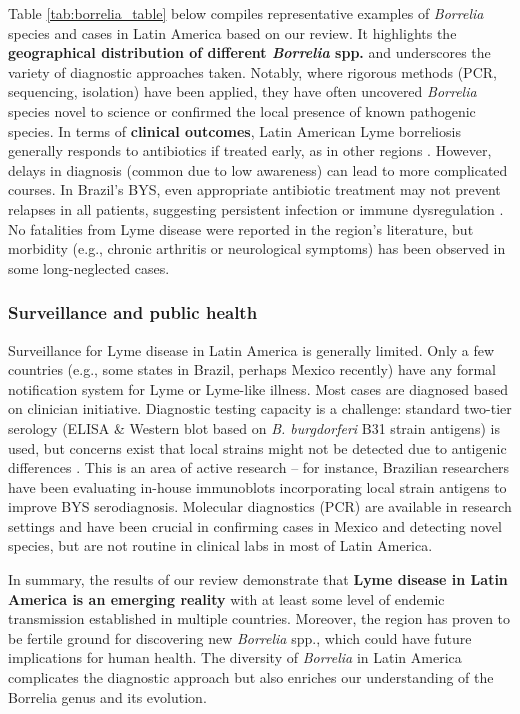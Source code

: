 \documentclass[11pt,letterpaper]{article}
\begin{document}
Table \ref{tab:borrelia_table} below compiles representative examples of \textit{Borrelia} species and cases in Latin America based on our review. It highlights the \textbf{geographical distribution of different \textit{Borrelia} spp.} and underscores the variety of diagnostic approaches taken. Notably, where rigorous methods (PCR, sequencing, isolation) have been applied, they have often uncovered \textit{Borrelia} species novel to science or confirmed the local presence of known pathogenic species. In terms of \textbf{clinical outcomes}, Latin American Lyme borreliosis generally responds to antibiotics if treated early, as in other regions \citep{Yoshinari2022x}. However, delays in diagnosis (common due to low awareness) can lead to more complicated courses. In Brazil’s BYS, even appropriate antibiotic treatment may not prevent relapses in all patients, suggesting persistent infection or immune dysregulation \citep{Yoshinari2022y, Yoshinari2022z}. No fatalities from Lyme disease were reported in the region’s literature, but morbidity (e.g., chronic arthritis or neurological symptoms) has been observed in some long-neglected cases.

\subsubsection{Surveillance and public health}
Surveillance for Lyme disease in Latin America is generally limited. Only a few countries (e.g., some states in Brazil, perhaps Mexico recently) have any formal notification system for Lyme or Lyme-like illness. Most cases are diagnosed based on clinician initiative. Diagnostic testing capacity is a challenge: standard two-tier serology (ELISA \& Western blot based on \textit{B. burgdorferi} B31 strain antigens) is used, but concerns exist that local strains might not be detected due to antigenic differences \citep{Yoshinari2022aa}. This is an area of active research – for instance, Brazilian researchers have been evaluating in-house immunoblots incorporating local strain antigens to improve BYS serodiagnosis. Molecular diagnostics (PCR) are available in research settings and have been crucial in confirming cases in Mexico and detecting novel species, but are not routine in clinical labs in most of Latin America.

In summary, the results of our review demonstrate that \textbf{Lyme disease in Latin America is an emerging reality} with at least some level of endemic transmission established in multiple countries. Moreover, the region has proven to be fertile ground for discovering new \textit{Borrelia} spp., which could have future implications for human health. The diversity of \textit{Borrelia} in Latin America complicates the diagnostic approach but also enriches our understanding of the Borrelia genus and its evolution.
\end{document}

